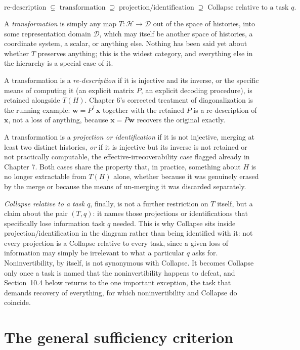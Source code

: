\documentclass[11pt]{book}
\begin{document}
\[
\text{re-description} \;\subsetneq\; \text{transformation} \;\supseteq\; \text{projection/identification} \;\supseteq\; \text{Collapse relative to a task } q.
\]

A \emph{transformation} is simply any map $T:\mathcal H \to \mathcal D$ out of the space of histories, into some representation domain $\mathcal D$, which may itself be another space of histories, a coordinate system, a scalar, or anything else. Nothing has been said yet about whether $T$ preserves anything; this is the widest category, and everything else in the hierarchy is a special case of it.

A transformation is a \emph{re-description} if it is injective and its inverse, or the specific means of computing it (an explicit matrix $P$, an explicit decoding procedure), is retained alongside $T(H)$. Chapter 6's corrected treatment of diagonalization is the running example: $\mathbf{w}=P^{\mathsf T}\mathbf{x}$ together with the retained $P$ is a re-description of $\mathbf{x}$, not a loss of anything, because $\mathbf{x}=P\mathbf{w}$ recovers the original exactly.

A transformation is a \emph{projection or identification} if it is not injective, merging at least two distinct histories, \emph{or} if it is injective but its inverse is not retained or not practically computable, the effective-irrecoverability case flagged already in Chapter 7. Both cases share the property that, in practice, something about $H$ is no longer extractable from $T(H)$ alone, whether because it was genuinely erased by the merge or because the means of un-merging it was discarded separately.

\emph{Collapse relative to a task $q$}, finally, is not a further restriction on $T$ itself, but a claim about the pair $(T,q)$: it names those projections or identifications that specifically lose information task $q$ needed. This is why Collapse sits inside projection/identification in the diagram rather than being identified with it: not every projection is a Collapse relative to every task, since a given loss of information may simply be irrelevant to what a particular $q$ asks for. Noninvertibility, by itself, is not synonymous with Collapse. It becomes Collapse only once a task is named that the noninvertibility happens to defeat, and Section~10.4 below returns to the one important exception, the task that demands recovery of everything, for which noninvertibility and Collapse do coincide.

\section{The general sufficiency criterion}
\end{document}
